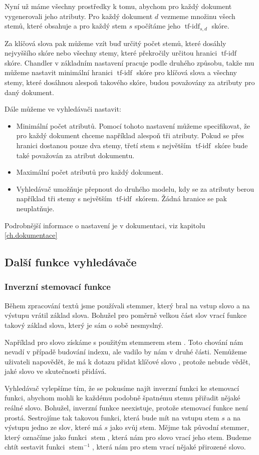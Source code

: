 \documentclass[12pt]{article}
\newcommand{\name}{Chandler}
\newcommand{\ssection}[1]{\subsection{#1}}
\newcommand{\sssection}[1]{\subsubsection{#1}}
\DeclareMathOperator{\tfidf}{tf-idf}
\DeclareMathOperator{\stem}{stem}
\newcommand{\invstem}{\stem^{-1}}
\begin{document}
Nyní už máme všechny prostředky k tomu, abychom pro každý dokument vygenerovali jeho atributy. Pro každý dokument $d$ vezmeme množinu všech stemů, které obsahuje a pro každý stem $s$ spočítáme jeho $\tfidf_{s,d}$ skóre. 

Za klíčová slova pak můžeme vzít buď určitý počet stemů, které dosáhly nejvyššího skóre nebo všechny stemy, které překročily určitou hranici $\tfidf$ skóre. \name{} v základním nastavení pracuje podle druhého způsobu, takže mu můžeme nastavit minimální hranici $\tfidf$ skóre pro klíčová slova a všechny stemy, které dosáhnou alespoň takového skóre, budou považovány za atributy pro daný dokument. 

Dále můžeme ve vyhledávači nastavit:

\begin{itemize}
	\item Minimální počet atributů. Pomocí tohoto nastavení můžeme specifikovat, že pro každý dokument chceme například alespoň tři atributy. Pokud se přes hranici dostanou pouze dva stemy, třetí stem s největším $\tfidf$ skóre bude také považován za atribut dokumentu. 
	\item Maximální počet atributů pro každý dokument. 
	\item Vyhledávač umožňuje přepnout do druhého modelu, kdy se za atributy berou například tři stemy s největším $\tfidf$ skórem. Žádná hranice se pak neuplatňuje. 
\end{itemize}

Podrobnější informace o nastavení je v dokumentaci, viz kapitolu \ref{ch.dokumentace}

\ssection{Další funkce vyhledávače}
\sssection{Inverzní stemovací funkce}

Během zpracování textů jsme používali stemmer, který bral na vstup slovo a na výstupu vrátil základ slova. Bohužel pro poměrně velkou část slov vrací funkce takový základ slova, který je sám o sobě nesmyslný. 

Například pro slovo  získáme s použitým stemmerem stem . Toto chování nám nevadí v případě budování indexu, ale vadilo by nám v druhé části. Nemůžeme uživateli napovědět, že má k dotazu přidat klíčové slovo , protože nebude vědět, jaké slovo ve skutečnosti přidává. 

Vyhledávač vylepšíme tím, že se pokusíme najít inverzní funkci ke stemovací funkci, abychom mohli ke každému podobně špatnému stemu přiřadit nějaké reálné slovo. Bohužel, inverzní funkce neexistuje, protože stemovací funkce není prostá. Sestrojíme tak takovou funkci, která bude mít na vstupu stem $s$ a na výstupu jedno ze slov, které má $s$ jako svůj stem. Mějme tak původní stemmer, který označíme jako funkci $\stem$, která nám pro slovo vrací jeho stem. Budeme chtít sestavit funkci $\invstem$, která nám pro stem vrací nějaké přirozené slovo.
\end{document}
